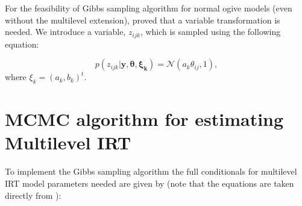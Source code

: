 \documentclass[12pt]{article}
\begin{document}
For the feasibility of Gibbs sampling algorithm for normal ogive models (even without the multilevel extension), \cite{albert1992bayesian} proved that a variable transformation is needed. We introduce a variable, $z_{ijk}$, which is sampled using the following equation:

\begin{equation*}
    p(z_{ijk}| \boldsymbol{y, \theta, \xi_k}) = \mathcal{N}(a_k \theta_{ij}, 1),
\end{equation*}
where $\xi_k = (a_k, b_k)^t.$


\section{MCMC algorithm for estimating Multilevel IRT}  \label{sec:full_conditionals_mlirt}
To implement the Gibbs sampling algorithm the full conditionals for multilevel IRT model parameters needed are given by (note that the equations are taken directly from \cite{fox2007multilevel}):
\end{document}
